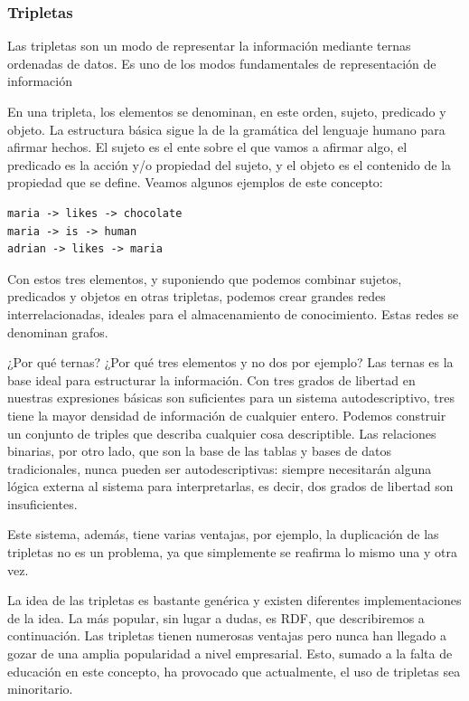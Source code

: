 \documentclass[openright,twoside,12pt]{book}
\begin{document}
\subsubsection{Tripletas}
Las tripletas son un modo de representar la información mediante ternas ordenadas de datos.
Es uno de los modos fundamentales de representación de información

En una tripleta, los elementos se denominan, en este orden, sujeto, predicado y objeto. La estructura básica sigue la de la gramática del lenguaje humano para afirmar hechos.
El sujeto es el ente sobre el que vamos a afirmar algo, el predicado es la acción y/o propiedad del sujeto, y el objeto es el contenido de la propiedad que se define.
Veamos algunos ejemplos de este concepto:
\begin{verbatim}
maria -> likes -> chocolate
maria -> is -> human
adrian -> likes -> maria
\end{verbatim}
Con estos tres elementos, y suponiendo que podemos combinar sujetos, predicados y objetos en otras tripletas, podemos crear grandes redes interrelacionadas, ideales para el almacenamiento de conocimiento.
Estas redes se denominan grafos.

¿Por qué ternas? ¿Por qué tres elementos y no dos por ejemplo? Las ternas es la base ideal para estructurar la información. Con tres grados de libertad en nuestras expresiones básicas son suficientes para un sistema autodescriptivo, tres tiene la mayor densidad de información de cualquier entero. Podemos construir un conjunto de triples que describa cualquier cosa descriptible. Las relaciones binarias, por otro lado, que son la base de las tablas y bases de datos tradicionales, nunca pueden ser autodescriptivas: siempre necesitarán alguna lógica externa al sistema para interpretarlas, es decir, dos grados de libertad son insuficientes.\cite{rdf}

Este sistema, además, tiene varias ventajas, por ejemplo, la duplicación de las tripletas no es un problema, ya que simplemente se reafirma lo mismo una y otra vez.

La idea de las tripletas es bastante genérica y existen diferentes implementaciones de la idea. La más popular, sin lugar a dudas, es RDF, que describiremos a continuación.
Las tripletas tienen numerosas ventajas pero nunca han llegado a gozar de una amplia popularidad a nivel empresarial.\cite{stackoverflowsurvey}
Esto, sumado a la falta de educación en este concepto, ha provocado que actualmente, el uso de tripletas sea minoritario.
\end{document}
